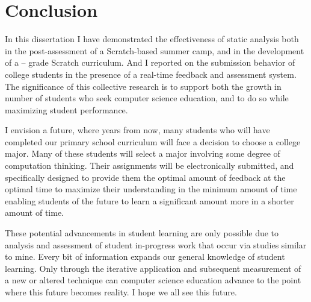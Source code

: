 \chapter{Conclusion} \label{chap:conclusion}

In this dissertation I have demonstrated the effectiveness of static analysis
both in the post-assessment of a Scratch-based summer camp, and in the
development of a  --  grade Scratch curriculum. And I reported on
the submission behavior of college students in the presence of a real-time
feedback and assessment system. The significance of this collective research is
to support both the growth in number of students who seek computer science
education, and to do so while maximizing student performance.

I envision a future, where years from now, many students who will have
completed our primary school curriculum will face a decision to choose a
college major. Many of these students will select a major involving some degree
of computation thinking. Their assignments will be electronically submitted,
and specifically designed to provide them the optimal amount of feedback at the
optimal time to maximize their understanding in the minimum amount of time
enabling students of the future to learn a significant amount more in a shorter
amount of time.

These potential advancements in student learning are only possible due to
analysis and assessment of student in-progress work that occur via studies
similar to mine. Every bit of information expands our general knowledge of
student learning. Only through the iterative application and subsequent
measurement of a new or altered technique can computer science education
advance to the point where this future becomes reality. I hope we all see this
future.
